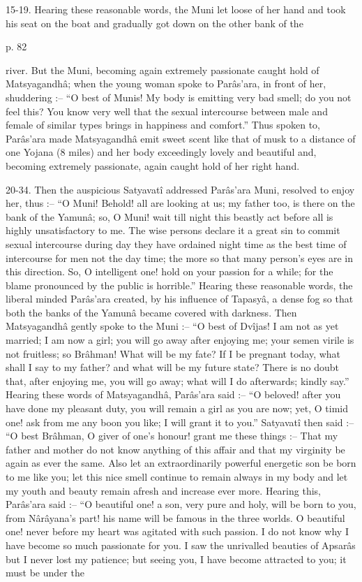  

15-19. Hearing these reasonable words, the Muni let loose of her hand and took his seat on the boat and gradually got down on the other bank of the

 

p. 82

 

river. But the Muni, becoming again extremely passionate caught hold of Matsyagandhâ; when the young woman spoke to Parâs’ara, in front of her, shuddering :-- “O best of Munis! My body is emitting very bad smell; do you not feel this? You know very well that the sexual intercourse between male and female of similar types brings in happiness and comfort.” Thus spoken to, Parâs’ara made Matsyagandhâ emit sweet scent like that of musk to a distance of one Yojana (8 miles) and her body exceedingly lovely and beautiful and, becoming extremely passionate, again caught hold of her right hand.

 

20-34. Then the auspicious Satyavatî addressed Parâs’ara Muni, resolved to enjoy her, thus :-- “O Muni! Behold! all are looking at us; my father too, is there on the bank of the Yamunâ; so, O Muni! wait till night this beastly act before all is highly unsatisfactory to me. The wise persons declare it a great sin to commit sexual intercourse during day they have ordained night time as the best time of intercourse for men not the day time; the more so that many person's eyes are in this direction. So, O intelligent one! hold on your passion for a while; for the blame pronounced by the public is horrible.” Hearing these reasonable words, the liberal minded Parâs'ara created, by his influence of Tapasyâ, a dense fog so that both the banks of the Yamunâ became covered with darkness. Then Matsyagandhâ gently spoke to the Muni :-- “O best of Dvîjas! I am not as yet married; I am now a girl; you will go away after enjoying me; your semen virile is not fruitless; so Brâhman! What will be my fate? If I be pregnant today, what shall I say to my father? and what will be my future state? There is no doubt that, after enjoying me, you will go away; what will I do afterwards; kindly say.” Hearing these words of Matsyagandhâ, Parâs'ara said :-- “O beloved! after you have done my pleasant duty, you will remain a girl as you are now; yet, O timid one! ask from me any boon you like; I will grant it to you.” Satyavatî then said :-- “O best Brâhman, O giver of one's honour! grant me these things :-- That my father and mother do not know anything of this affair and that my virginity be again as ever the same. Also let an extraordinarily powerful energetic son be born to me like you; let this nice smell continue to remain always in my body and let my youth and beauty remain afresh and increase ever more. Hearing this, Parâs'ara said :-- “O beautiful one! a son, very pure and holy, will be born to you, from Nârâyana's part! his name will be famous in the three worlds. O beautiful one! never before my heart was agitated with such passion. I do not know why I have become so much passionate for you. I saw the unrivalled beauties of Apsarâs but I never lost my patience; but seeing you, I have become attracted to you; it must be under the

